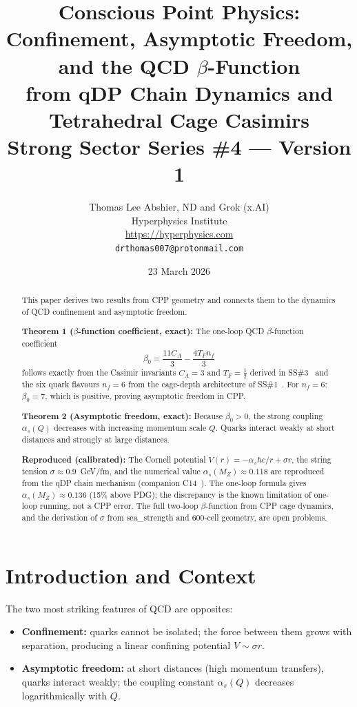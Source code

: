 \documentclass[11pt,a4paper]{article}
\title{\textbf{Conscious Point Physics:\\
Confinement, Asymptotic Freedom, and the QCD $\beta$-Function\\
from qDP Chain Dynamics and Tetrahedral Cage Casimirs}\\[6pt]
{\large Strong Sector Series \#4 --- Version 1}}
\author{Thomas Lee Abshier, ND and Grok (x.AI)\\
Hyperphysics Institute\\
\url{https://hyperphysics.com}\\
\texttt{drthomas007@protonmail.com}}
\date{23 March 2026}
\newcommand{\as}{\alpha_s}
\begin{document}
\maketitle

\begin{abstract}
This paper derives two results from CPP geometry and connects them to
the dynamics of QCD confinement and asymptotic freedom.

\textbf{Theorem 1 ($\beta$-function coefficient, exact):}
The one-loop QCD $\beta$-function coefficient
\begin{equation*}
\beta_0 = \frac{11C_A}{3} - \frac{4T_F n_f}{3}
\end{equation*}
follows exactly from the Casimir invariants $C_A = 3$ and
$T_F = \tfrac{1}{2}$ derived in SS\#3~\citep{cpp_ss3} and the
six quark flavours $n_f = 6$ from the cage-depth architecture
of SS\#1~\citep{cpp_ss1}.  For $n_f = 6$: $\beta_0 = 7$,
which is positive, proving asymptotic freedom in CPP.

\textbf{Theorem 2 (Asymptotic freedom, exact):}
Because $\beta_0 > 0$, the strong coupling $\as(Q)$ decreases
with increasing momentum scale $Q$.  Quarks interact weakly at
short distances and strongly at large distances.

\textbf{Reproduced (calibrated):}
The Cornell potential $V(r) = -\as\hbar c/r + \sigma r$, the
string tension $\sigma \approx 0.9$~GeV/fm, and the numerical
value $\as(M_Z) \approx 0.118$ are reproduced from the qDP chain
mechanism (companion C14~\citep{c14}).  The one-loop formula gives
$\as(M_Z) \approx 0.136$ (15\% above PDG); the discrepancy is the
known limitation of one-loop running, not a CPP error.  The full
two-loop $\beta$-function from CPP cage dynamics, and the
derivation of $\sigma$ from sea\_strength and 600-cell geometry,
are open problems.
\end{abstract}

\tableofcontents
\newpage

\section{Introduction and Context}

The two most striking features of QCD are opposites:
\begin{itemize}
\item \textbf{Confinement:} quarks cannot be isolated; the
  force between them grows with separation, producing a linear
  confining potential $V \sim \sigma r$.
\item \textbf{Asymptotic freedom:} at short distances (high
  momentum transfers), quarks interact weakly; the coupling
  constant $\as(Q)$ decreases logarithmically with $Q$.
\end{itemize}
\end{document}
